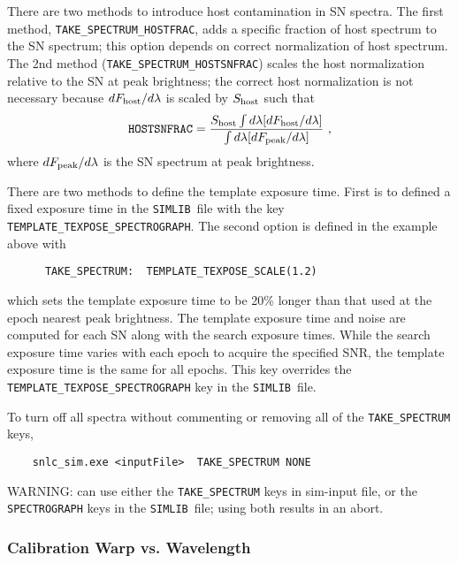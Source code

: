 \documentclass[12pt]{article}
\newcommand{\SPEC}{{\tt SPECTROGRAPH}}
\newcommand{\simlib}{{\tt SIMLIB}}
\newcommand{\lam}{\lambda}
\begin{document}
\medskip
\newcommand{\scaleFlamHost}{S_{\rm host}}
\newcommand{\dFlamHost}{dF_{\rm host}/d\lam}
\newcommand{\dFlamPeak}{dF_{\rm peak}/d\lam}
There are two methods to introduce host contamination in SN spectra.
The first method, {\tt TAKE\_SPECTRUM\_HOSTFRAC}, adds a specific fraction
of host spectrum to the SN spectrum; this option depends on correct
normalization of host spectrum. 
The 2nd method ({\tt TAKE\_SPECTRUM\_HOSTSNFRAC}) scales the host 
normalization relative to the SN at peak brightness;
the correct host normalization is not necessary because 
$\dFlamHost$ is scaled by $\scaleFlamHost$ such that
\begin{equation}
   {\rm\tt HOSTSNFRAC} =      
    \frac{\scaleFlamHost\int d\lam [\dFlamHost]}{ \int d\lam [\dFlamPeak ]}~,
\end{equation}
%
where $\dFlamPeak$ is the SN spectrum at peak brightness.

\medskip
There are two methods to define the template exposure time.
First is to defined a fixed exposure time in the \simlib\ file
with the key {\tt TEMPLATE\_TEXPOSE\_SPECTROGRAPH}.
The second option is defined in the example above with
%
\vspace{-0.4cm}
\begin{verbatim}
      TAKE_SPECTRUM:  TEMPLATE_TEXPOSE_SCALE(1.2)
\end{verbatim}
%
which sets the template exposure time to be 20\% longer than
that used at the epoch nearest peak brightness. 
The template exposure time and noise are computed for each SN
along with the search exposure times. While the search
exposure time varies with each epoch to acquire the specified
SNR, the template exposure time is the same for all epochs.
This key overrides the {\tt TEMPLATE\_TEXPOSE\_SPECTROGRAPH} 
key in the \simlib\ file.

\medskip
To turn off all spectra without commenting or removing all of the 
{\tt TAKE\_SPECTRUM} keys, 
\vspace{-0.4cm}
\begin{verbatim}
    snlc_sim.exe <inputFile>  TAKE_SPECTRUM NONE
\end{verbatim}

\medskip
WARNING: can use either the {\tt TAKE\_SPECTRUM} keys in sim-input file,
or the {\SPEC} keys in the \simlib\ file; using both results in an abort.


\subsubsection{Calibration Warp vs. Wavelength}
\label{sss:SPEC_WARP}
\end{document}
